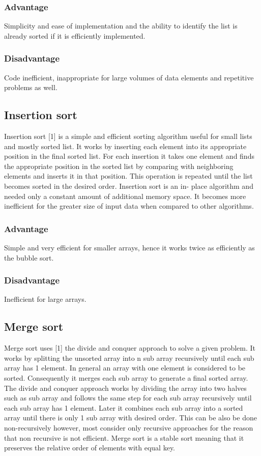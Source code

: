 \documentclass{article}
\begin{document}
\subsubsection{Advantage}
	Simplicity and ease of implementation and the ability to identify the list is already sorted if it is efficiently implemented.
	
\subsubsection{Disadvantage}
	Code inefficient, inappropriate for large volumes of data elements and repetitive problems as well.
	
\subsection{Insertion sort}
	Insertion sort [1] is a simple and efficient sorting algorithm useful for small lists and mostly sorted list. It works by inserting each element into its appropriate position in the final sorted list. For each insertion it takes one element and finds the appropriate position in the sorted list by comparing with neighboring elements and inserts it in that position. This operation is repeated until the list becomes sorted in the desired order. Insertion sort is an in- place algorithm and needed only a constant amount of additional memory space. It becomes more inefficient for the greater size of input data when compared to other algorithms.
	
\subsubsection{Advantage}
	 Simple and very efficient for smaller arrays, hence it works twice as efficiently as the bubble sort.

\subsubsection{Disadvantage}	
	 Inefficient for large arrays.
		
\subsection{Merge sort}
	Merge sort uses [1] the divide and conquer approach to solve a given problem. It works by splitting the unsorted array into n sub array recursively until each sub array has 1 element. In general an array with one element is considered to be sorted. Consequently it merges each sub array to generate afinal sorted array. The divide and conquer approach works by dividing the array into two halves such as sub array and follows the same step for each sub array recursively until each sub array has 1 element. Later it combines each sub array into a sorted array until there is only 1 sub array with desired order. This can be also be done non-recursively however, most consider only recursive approaches for the reason that non recursive is not efficient. Merge sort is a stable sort meaning that it preserves the relative order of elements with equal key.
\end{document}
